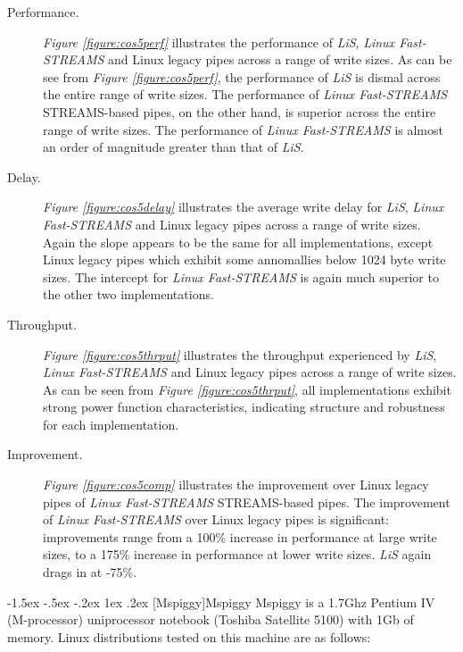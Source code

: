 \documentclass[letterpaper,final,notitlepage,twocolumn,10pt,twoside]{article}
\makeatletter
\renewcommand\subsection{\@startsection{subsection}{2}{\z@}%
                                     {-1.5ex \@plus -.5ex \@minus -.2ex}%
                                     {1ex \@plus .2ex}%
                                     {\normalfont\normalsize\bfseries}}
\makeatother
\begin{document}
\begin{description}

\item[Performance.]

\textit{Figure \ref{figure:cos5perf}} illustrates the performance of
\textsl{LiS}, \textsl{Linux Fast-STREAMS} and Linux legacy pipes across a
range of write sizes.  As can be see from \textit{Figure
\ref{figure:cos5perf}}, the performance of \textsl{LiS} is dismal across the
entire range of write sizes.  The performance of \textsl{Linux Fast-STREAMS}
STREAMS-based pipes, on the other hand, is superior across the entire range of
write sizes.  The performance of \textsl{Linux Fast-STREAMS} is almost an
order of magnitude greater than that of \textsl{LiS}.

\item[Delay.]

\textit{Figure \ref{figure:cos5delay}} illustrates the average write delay for
\textsl{LiS}, \textsl{Linux Fast-STREAMS} and Linux legacy pipes across a
range of write sizes.  Again the slope appears to be the same for all
implementations, except Linux legacy pipes which exhibit some annomallies
below 1024 byte write sizes.  The intercept for \textsl{Linux Fast-STREAMS} is
again much superior to the other two implementations.

\item[Throughput.]

\textit{Figure \ref{figure:cos5thrput}} illustrates the throughput experienced
by \textsl{LiS}, \textsl{Linux Fast-STREAMS} and Linux legacy pipes across a
range of write sizes.  As can be seen from \textit{Figure
\ref{figure:cos5thrput}}, all implementations exhibit strong power function
characteristics, indicating structure and robustness for each implementation.

\item[Improvement.]

\textit{Figure \ref{figure:cos5comp}} illustrates the improvement over Linux
legacy pipes of \textsl{Linux Fast-STREAMS} STREAMS-based pipes.  The
improvement of \textsl{Linux Fast-STREAMS} over Linux legacy pipes is
significant: improvements range from a 100\% increase in performance at large
write sizes, to a 175\% increase in performance at lower write sizes.
\textsl{LiS} again drags in at -75\%.

\end{description}

\subsection[Mspiggy]{Mspiggy}
Mspiggy is a 1.7Ghz Pentium IV (M-processor) uniprocessor notebook (Toshiba
Satellite 5100) with 1Gb of memory.  Linux distributions tested on this
machine are as follows:
\end{document}
